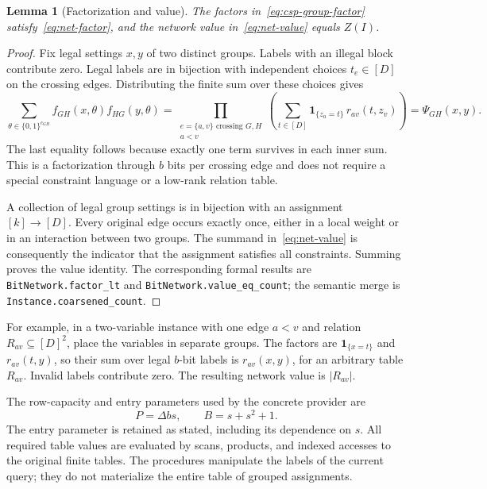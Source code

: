 \documentclass[11pt,reqno]{amsart}
\numberwithin{equation}{section}
\newtheorem{lemma}[theorem]{Lemma}
\theoremstyle{definition}
\theoremstyle{remark}
\newcommand{\ind}[1]{\mathbf 1_{\{#1\}}}
\begin{document}
\begin{lemma}[Factorization and value]\label{lem:factor-value}
The factors in~\eqref{eq:csp-group-factor} satisfy~\eqref{eq:net-factor}, and the network value in~\eqref{eq:net-value} equals $Z(I)$.
\end{lemma}
\begin{proof}
Fix legal settings $x,y$ of two distinct groups. Labels with an illegal block contribute zero. Legal labels are in bijection with independent choices $t_e\in[D]$ on the crossing edges. Distributing the finite sum over these choices gives
\[
 \sum_{\theta\in\{0,1\}^{c_{GH}}}f_{GH}(x,\theta)f_{HG}(y,\theta)
 =\prod_{\substack{e=\{a,v\}\text{ crossing }G,H\\a<v}}
     \left(\sum_{t\in[D]}\ind{z_a=t}\,r_{av}(t,z_v)\right)
 =\Psi_{GH}(x,y).
\]
The last equality follows because exactly one term survives in each inner sum. This is a factorization through $b$ bits per crossing edge and does not require a special constraint language or a low-rank relation table.

A collection of legal group settings is in bijection with an assignment $[k]\to[D]$. Every original edge occurs exactly once, either in a local weight or in an interaction between two groups. The summand in~\eqref{eq:net-value} is consequently the indicator that the assignment satisfies all constraints. Summing proves the value identity. The corresponding formal results are \texttt{BitNetwork.factor\_lt} and \texttt{BitNetwork.value\_eq\_count}; the semantic merge is \texttt{Instance.coarsened\_count}.
\end{proof}

For example, in a two-variable instance with one edge $a<v$ and relation $R_{av}\subseteq[D]^2$, place the variables in separate groups. The factors are $\ind{x=t}$ and $r_{av}(t,y)$, so their sum over legal $b$-bit labels is $r_{av}(x,y)$, for an arbitrary table $R_{av}$. Invalid labels contribute zero. The resulting network value is $|R_{av}|$.

The row-capacity and entry parameters used by the concrete provider are
\begin{equation}\label{eq:provider}
 P=\Delta b s,\qquad B=s+s^2+1.
\end{equation}
The entry parameter is retained as stated, including its dependence on $s$. All required table values are evaluated by scans, products, and indexed accesses to the original finite tables. The procedures manipulate the labels of the current query; they do not materialize the entire table of grouped assignments.
\end{document}

